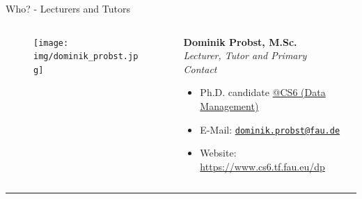 \begin{frame}{Who? - Lecturers and Tutors}

	\begin{columns}[T]
		\begin{column}{0.2\textwidth}
			\vspace{-1em}
			\begin{figure}[t]
				\centering
				\texttt{[image: img/dominik\_probst.jpg]}
			\end{figure}
		\end{column}
		\begin{column}{0.6\textwidth}
			\textbf{Dominik Probst, M.Sc.} \\
			\textit{Lecturer, Tutor and Primary Contact}
			\begin{itemize}
				\item Ph.D. candidate \href{https://www.cs6.tf.fau.eu}{@CS6 (Data Management)}
				\item E-Mail: \texttt{\href{mailto:dominik.probst@fau.de}{dominik.probst@fau.de}}
				\item Website: \url{https://www.cs6.tf.fau.eu/dp}
			\end{itemize}
		\end{column}
		\begin{column}{0.2\textwidth}
			\hfill
		\end{column}
	\end{columns}

	\vspace{0.5em}
	{\color{lightgray}\hrule}
	\vspace{1em}


\end{frame}
